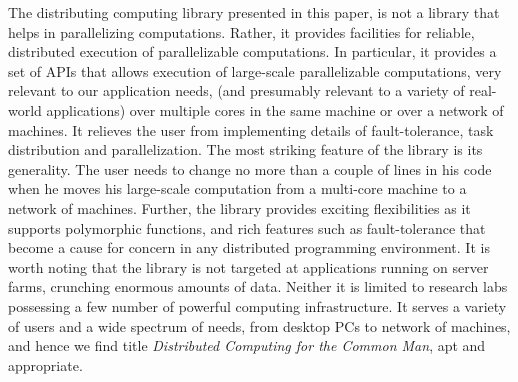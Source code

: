\documentclass[preprint]{sigplanconf}
\begin{document}
The distributing computing library presented in this paper, is not a
library that helps in parallelizing computations. Rather, it provides
facilities for reliable, distributed execution of parallelizable
computations. In particular, it provides a set of APIs that allows
execution of large-scale parallelizable computations, very relevant to
our application needs, (and presumably relevant to a variety of
real-world applications) over multiple cores in the same machine or
over a network of machines. It relieves the user from implementing
details of fault-tolerance, task distribution and parallelization. The
most striking feature of the library is its generality. The user needs
to change no more than a couple of lines in his code when he moves his
large-scale computation from a multi-core machine to a network of
machines. Further, the library provides exciting flexibilities as it
supports polymorphic functions, and rich features such as
fault-tolerance that become a cause for concern in any distributed
programming environment. It is worth noting that the library is not
targeted at applications running on server farms, crunching enormous
amounts of data. Neither it is limited to research labs possessing a
few number of powerful computing infrastructure. It serves a variety
of users and a wide spectrum of needs, from desktop PCs to network of
machines, and hence we find title \emph{Distributed Computing for the
  Common Man}, apt and appropriate.



\end{document}
